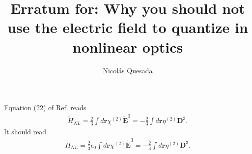 \documentclass[twocolumn,pra]{revtex4}
\newcommand{\eq}[1]{\begin{align}#1\end{align}}
\begin{document}
\title{Erratum for:  Why you should not use the electric field to quantize in nonlinear optics}
\author{Nicol\'as Quesada}

\maketitle
Equation (22) of Ref. \cite{quesada2017quantize} reads
\eq{
\tilde{H}_{NL} = \frac{2}{3} \int d \mathbf{r} \chi^{(2)} \tilde{\mathbf{E}}^3 = -\frac{2}{3} \int d\mathbf{r} \eta^{(2)} \mathbf{D}^3.
}
It should read
\eq{
\tilde{H}_{NL} = \frac{2}{3} \epsilon_0 \int d \mathbf{r} \chi^{(2)} \tilde{\mathbf{E}}^3 = -\frac{2}{3} \int d\mathbf{r} \eta^{(2)} \mathbf{D}^3.
}



\end{document}
